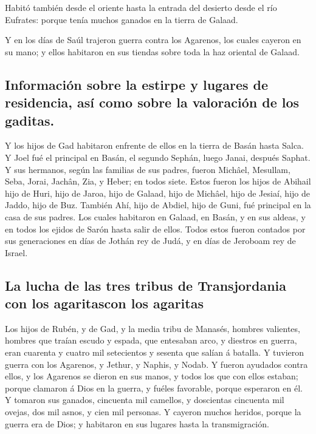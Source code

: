  Habitó también desde el oriente hasta la entrada del
desierto desde el río Eufrates: porque tenía muchos ganados en la tierra
de Galaad.

 Y en los días de Saúl trajeron guerra contra los Agarenos,
los cuales cayeron en su mano; y ellos habitaron en sus tiendas sobre
toda la haz oriental de Galaad.

\hypertarget{informaciuxf3n-sobre-la-estirpe-y-lugares-de-residencia-asuxed-como-sobre-la-valoraciuxf3n-de-los-gaditas.}{%
\subsection{Información sobre la estirpe y lugares de residencia, así
como sobre la valoración de los
gaditas.}\label{informaciuxf3n-sobre-la-estirpe-y-lugares-de-residencia-asuxed-como-sobre-la-valoraciuxf3n-de-los-gaditas.}}

 Y los hijos de Gad habitaron enfrente de ellos en la
tierra de Basán hasta Salca.  Y Joel fué el principal en
Basán, el segundo Sephán, luego Janai, después Saphat.  Y
sus hermanos, según las familias de sus padres, fueron Michâel,
Mesullam, Seba, Jorai, Jachân, Zia, y Heber; en todos siete.
 Estos fueron los hijos de Abihail hijo de Huri, hijo de
Jaroa, hijo de Galaad, hijo de Michâel, hijo de Jesiaí, hijo de Jaddo,
hijo de Buz.  También Ahí, hijo de Abdiel, hijo de Guni,
fué principal en la casa de sus padres.  Los cuales
habitaron en Galaad, en Basán, y en sus aldeas, y en todos los ejidos de
Sarón hasta salir de ellos.  Todos estos fueron contados
por sus generaciones en días de Jothán rey de Judá, y en días de
Jeroboam rey de Israel.

\hypertarget{la-lucha-de-las-tres-tribus-de-transjordania-con-los-agaritascon-los-agaritas}{%
\subsection{La lucha de las tres tribus de Transjordania con los
agaritascon los
agaritas}\label{la-lucha-de-las-tres-tribus-de-transjordania-con-los-agaritascon-los-agaritas}}

 Los hijos de Rubén, y de Gad, y la media tribu de Manasés,
hombres valientes, hombres que traían escudo y espada, que entesaban
arco, y diestros en guerra, eran cuarenta y cuatro mil setecientos y
sesenta que salían á batalla.  Y tuvieron guerra con los
Agarenos, y Jethur, y Naphis, y Nodab.  Y fueron ayudados
contra ellos, y los Agarenos se dieron en sus manos, y todos los que con
ellos estaban; porque clamaron á Dios en la guerra, y fuéles favorable,
porque esperaron en él.  Y tomaron sus ganados, cincuenta
mil camellos, y doscientas cincuenta mil ovejas, dos mil asnos, y cien
mil personas.  Y cayeron muchos heridos, porque la guerra
era de Dios; y habitaron en sus lugares hasta la transmigración.

